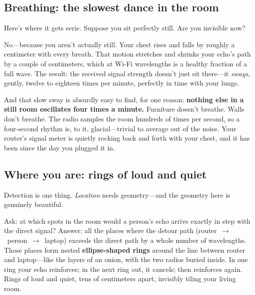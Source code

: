 \documentclass[11pt, letterpaper]{article}
\begin{document}
\subsection{Breathing: the slowest dance in the room}

Here's where it gets eerie. Suppose you sit perfectly still. Are you invisible now?

No---because you aren't actually still. Your chest rises and falls by roughly a centimeter with every breath. That motion stretches and shrinks your echo's path by a couple of centimeters, which at Wi-Fi wavelengths is a healthy fraction of a full wave. The result: the received signal strength doesn't just sit there---it \textit{sways}, gently, twelve to eighteen times per minute, perfectly in time with your lungs.

And that slow sway is absurdly easy to find, for one reason: \textbf{nothing else in a still room oscillates four times a minute.} Furniture doesn't breathe. Walls don't breathe. The radio samples the room hundreds of times per second, so a four-second rhythm is, to it, glacial---trivial to average out of the noise. Your router's signal meter is quietly rocking back and forth with your chest, and it has been since the day you plugged it in.

\subsection{Where you are: rings of loud and quiet}

Detection is one thing. \textit{Location} needs geometry---and the geometry here is genuinely beautiful.

Ask: at which spots in the room would a person's echo arrive exactly in step with the direct signal? Answer: all the places where the detour path (router~$\to$~person~$\to$~laptop) exceeds the direct path by a whole number of wavelengths. Those places form nested \textbf{ellipse-shaped rings} around the line between router and laptop---like the layers of an onion, with the two radios buried inside. In one ring your echo reinforces; in the next ring out, it cancels; then reinforces again. Rings of loud and quiet, tens of centimeters apart, invisibly tiling your living room.
\end{document}
